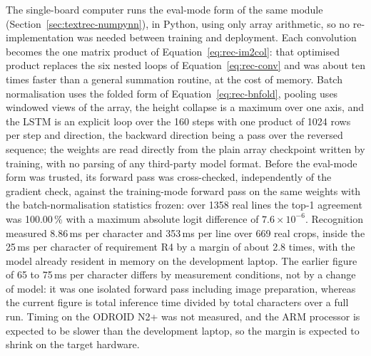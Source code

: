 The single-board computer runs the eval-mode form of the same module (Section~\ref{sec:textrec-numpynn}), in Python, using only array arithmetic, so no re-implementation was needed between training and deployment.
Each convolution becomes the one matrix product of Equation~\ref{eq:rec-im2col}: that optimised product replaces the six nested loops of Equation~\ref{eq:rec-conv} and was about ten times faster than a general summation routine, at the cost of memory.
Batch normalisation uses the folded form of Equation~\ref{eq:rec-bnfold}, pooling uses windowed views of the array, the height collapse is a maximum over one axis, and the LSTM is an explicit loop over the 160 steps with one product of 1024 rows per step and direction, the backward direction being a pass over the reversed sequence; the weights are read directly from the plain array checkpoint written by training, with no parsing of any third-party model format.
Before the eval-mode form was trusted, its forward pass was cross-checked, independently of the gradient check, against the training-mode forward pass on the same weights with the batch-normalisation statistics frozen: over 1358 real lines the top-1 agreement was 100.00\,\% with a maximum absolute logit difference of $7.6\times10^{-6}$.
Recognition measured 8.86\,ms per character and 353\,ms per line over 669 real crops, inside the 25\,ms per character of requirement R4 by a margin of about 2.8 times, with the model already resident in memory on the development laptop.
The earlier figure of 65 to 75\,ms per character differs by measurement conditions, not by a change of model: it was one isolated forward pass including image preparation, whereas the current figure is total inference time divided by total characters over a full run.
Timing on the ODROID N2+ was not measured, and the ARM processor is expected to be slower than the development laptop, so the margin is expected to shrink on the target hardware.

